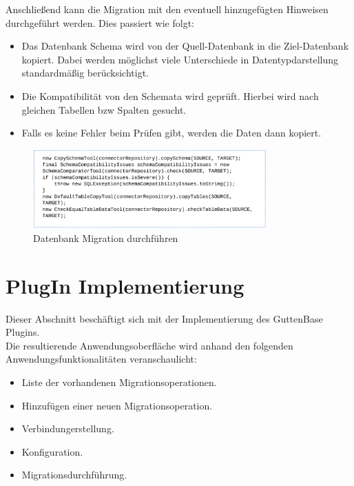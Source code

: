 	
	Anschließend kann die Migration mit den eventuell hinzugefügten Hinweisen durchgeführt werden. Dies passiert wie folgt:
	\begin{itemize}
		\item Das Datenbank Schema wird von der Quell-Datenbank in die Ziel-Datenbank kopiert. Dabei werden möglichst viele Unterschiede in Datentypdarstellung standardmäßig berücksichtigt.
		\item Die Kompatibilität von den Schemata wird geprüft. Hierbei wird nach gleichen Tabellen bzw Spalten gesucht.
		\item Falls es keine Fehler beim Prüfen gibt, werden die Daten dann kopiert.
	\end{itemize}
	\begin{figure}[H]
		\centering
		\includegraphics[width=0.8\textwidth]{images/gb/copy}
		\caption{Datenbank Migration durchführen}
		\label{img:gb/copy}
	\end{figure}
	
	
	
\section{PlugIn Implementierung}
\label{sec:imp}

Dieser Abschnitt beschäftigt sich mit der Implementierung des GuttenBase Plugins.\\
Die resultierende Anwendungsoberfläche wird anhand den folgenden Anwendungsfunktionalitäten veranschaulicht:
\begin{itemize}
	\item Liste der vorhandenen Migrationsoperationen.
	\item Hinzufügen einer neuen Migrationsoperation.
	\item Verbindungerstellung.
	\item Konfiguration.
	\item Migrationsdurchführung.
\end{itemize}

